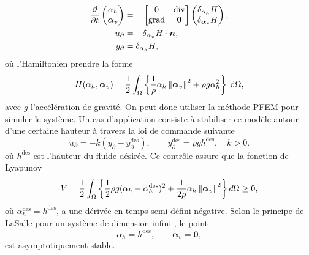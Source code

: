 \begin{equation*}
\begin{aligned}
\diffp{}{t}
\begin{pmatrix}
\alpha_h \\
\bm{\alpha}_v \\
\end{pmatrix} &= -
\begin{bmatrix}
0 & \div \\
\grad & \bm{0}
\end{bmatrix}
\begin{pmatrix}
\delta_{\alpha_h} H\\
\delta_{\bm{\alpha}_v} H
\end{pmatrix},  \\
{u}_\partial &= - \delta_{\bm{\alpha}_v} H \cdot\bm{n}, \\
{y}_\partial &= \delta_{\alpha_h} H, \\
\end{aligned} 
\end{equation*}
où l'Hamiltonien prendre la forme
\begin{equation*}
H(\alpha_h, \bm{\alpha}_v) = \energy{\frac{1}{\rho} \alpha_h \norm{\bm{\alpha}_v}^2 + \rho g \alpha_h^2},
\end{equation*}
avec $g$ l'accélération de gravité. On peut donc utiliser la méthode PFEM pour simuler le système. Un cas d'application consiste à stabiliser ce modèle autour d'une certaine hauteur à travers la loi de commande suivante
\begin{equation*}
u_\partial = -k (y_\partial - y_\partial^{\text{des}}), \qquad y_\partial^{\text{des}}= \rho g h^{\text{des}}, \quad k>0.
\end{equation*}
où $h^{\text{des}}$ est l'hauteur du fluide désirée. Ce contrôle assure que la fonction de Lyapunov 
\begin{equation*}
V = \frac{1}{2} \int_{\Omega}\left\{\frac{1}{2} \rho g (\alpha_h - \alpha_h^{\text{des}})^2 + \frac{1}{2\rho} \alpha_h \left\|\bm{\alpha}_v\right\|^2 \right\} d\Omega \ge 0,
\end{equation*}
où $\alpha_h^{\text{des}} = h^{\text{des}} $, a une dérivée en temps semi-défini négative. Selon le principe de LaSalle pour un système de dimension infini \cite{henry2006geometric}, le point
\begin{equation*}
\alpha_h = h^{\text{des}}, \qquad \bm{\alpha}_v = \bm{0},
\end{equation*}
est asymptotiquement stable. \\


